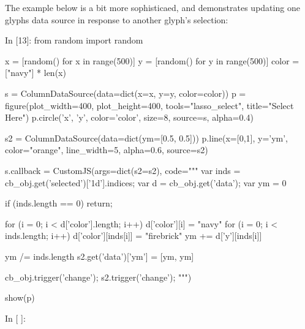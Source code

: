 The example below is a bit more sophisticaed, and demonstrates updating one glyphs data source in response to another glyph's selection:

In [13]:
from random import random

x = [random() for x in range(500)]
y = [random() for y in range(500)]
color = ["navy"] * len(x)

s = ColumnDataSource(data=dict(x=x, y=y, color=color))
p = figure(plot_width=400, plot_height=400, tools="lasso_select", title="Select Here")
p.circle('x', 'y', color='color', size=8, source=s, alpha=0.4)

s2 = ColumnDataSource(data=dict(ym=[0.5, 0.5]))
p.line(x=[0,1], y='ym', color="orange", line_width=5, alpha=0.6, source=s2)

s.callback = CustomJS(args=dict(s2=s2), code="""
    var inds = cb_obj.get('selected')['1d'].indices;
    var d = cb_obj.get('data');
    var ym = 0
    
    if (inds.length == 0) { return; }
    
    for (i = 0; i < d['color'].length; i++) {
        d['color'][i] = "navy"
    }
    for (i = 0; i < inds.length; i++) {
        d['color'][inds[i]] = "firebrick"
        ym += d['y'][inds[i]]
    }
    
    ym /= inds.length
    s2.get('data')['ym'] = [ym, ym]
    
    cb_obj.trigger('change');
    s2.trigger('change');
""")

show(p)
	
In [ ]:
 
 
 